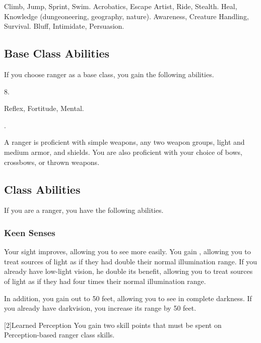      Climb, Jump, Sprint, Swim.
     Acrobatics, Escape Artist, Ride, Stealth.
     Heal, Knowledge (dungeoneering, geography, nature).
     Awareness, Creature Handling, Survival.
     Bluff, Intimidate, Persuasion.

    \subsection{Base Class Abilities}
        If you choose ranger as a base class, you gain the following abilities.

         8.

          Reflex,  Fortitude,  Mental.

         .

        A ranger is proficient with simple weapons, any two weapon groups, light and medium armor, and shields.
        You are also proficient with your choice of bows, crossbows, or thrown weapons.

    \subsection{Class Abilities}
        If you are a ranger, you have the following abilities.

        \subsubsection{Keen Senses}
            Your sight improves, allowing you to see more easily.
            You gain , allowing you to treat sources of light as if they had double their normal illumination range.
            If you already have low-light vision, he double its benefit, allowing you to treat sources of light as if they had four times their normal illumination range.

            In addition, you gain  out to 50 feet, allowing you to see in complete darkness.
            If you already have darkvision, you increase its range by 50 feet.

            [2]{Learned Perception} You gain two skill points that must be spent on Perception-based ranger class skills.

